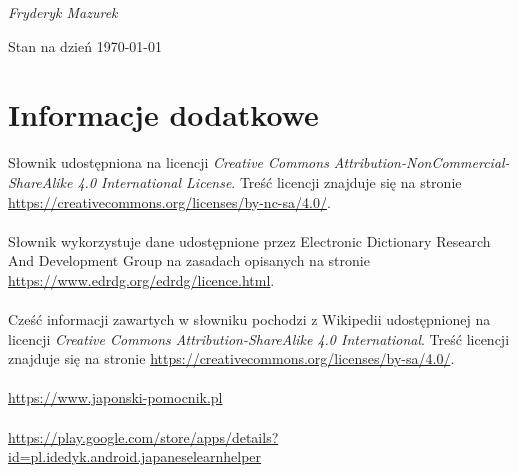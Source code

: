 \documentclass[10pt,a4paper,twoside,titlepage]{report} %
\begin{document}


\begin{titlepage}
	\centering
	\vspace*{6.5cm}
	\dictionaryTitle
	\vspace{2cm}
	{\Large\itshape Fryderyk Mazurek\par}
	
	\vfill

	{\large Stan na dzień \today\par}
\end{titlepage}

\tableofcontents



%



\newpage
\section*{Informacje dodatkowe}
\markboth{}{}

\noindent Słownik udostępniona na licencji \textit{Creative Commons Attribution-NonCommercial-ShareAlike 4.0 International License}. Treść licencji znajduje się na stronie \url{https://creativecommons.org/licenses/by-nc-sa/4.0/}.\\ \\
\noindent Słownik wykorzystuje dane udostępnione przez Electronic Dictionary Research And Development Group na zasadach opisanych na stronie \url{https://www.edrdg.org/edrdg/licence.html}. \\ \\
\noindent Cześć informacji zawartych w słowniku pochodzi z Wikipedii udostępnionej na licencji \textit{Creative Commons Attribution-ShareAlike 4.0 International}. Treść licencji znajduje się na stronie \url{https://creativecommons.org/licenses/by-sa/4.0/}. \\ \\
\noindent \url{https://www.japonski-pomocnik.pl} \\ \\
\noindent \url{https://play.google.com/store/apps/details?id=pl.idedyk.android.japaneselearnhelper}

\end{document}
